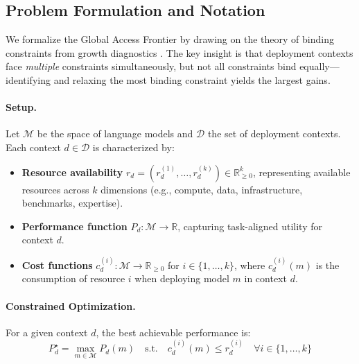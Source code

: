 
\subsection{Problem Formulation and Notation}

We formalize the Global Access Frontier by drawing on the theory of binding constraints from growth diagnostics \citep{hausmann2005growth}. The key insight is that deployment contexts face \emph{multiple} constraints simultaneously, but not all constraints bind equally---identifying and relaxing the most binding constraint yields the largest gains.

\paragraph{Setup.} Let $\mathcal{M}$ be the space of language models and $\mathcal{D}$ the set of deployment contexts. Each context $d \in \mathcal{D}$ is characterized by:
\begin{itemize}
    \item \textbf{Resource availability} $r_d = (r_d^{(1)}, \ldots, r_d^{(k)}) \in \mathbb{R}^k_{\geq 0}$, representing available resources across $k$ dimensions (e.g., compute, data, infrastructure, benchmarks, expertise).
    \item \textbf{Performance function} $P_d: \mathcal{M} \to \mathbb{R}$, capturing task-aligned utility for context $d$.
    \item \textbf{Cost functions} $c_d^{(i)}: \mathcal{M} \to \mathbb{R}_{\geq 0}$ for $i \in \{1, \ldots, k\}$, where $c_d^{(i)}(m)$ is the consumption of resource $i$ when deploying model $m$ in context $d$.
\end{itemize}

\paragraph{Constrained Optimization.} For a given context $d$, the best achievable performance is:
\begin{equation}
    P_d^\star = \max_{m \in \mathcal{M}} P_d(m) \quad \text{s.t.} \quad c_d^{(i)}(m) \leq r_d^{(i)} \quad \forall i \in \{1, \ldots, k\}
    \label{eq:constrained-opt}
\end{equation}

